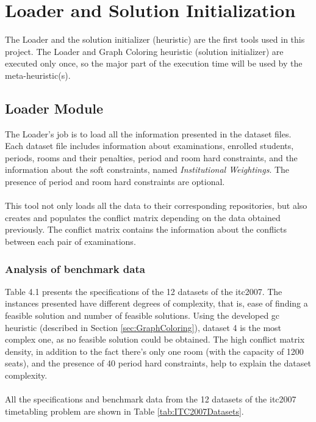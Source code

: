 \chapter{Loader and Solution Initialization}
\label{chap:SolutionInit}
\thispagestyle{plain}

The Loader and the solution initializer (heuristic) are the first tools used in this project. The Loader and Graph Coloring heuristic (solution initializer) are executed only once, so the major part of the execution time will be used by the meta-heuristic(s).

\section{Loader Module}
\label{sec:Loader}

The Loader's job is to load all the information presented in the dataset files. Each dataset file includes information about examinations, enrolled students, periods, rooms and their penalties, period and room hard constraints, and the information about the soft constraints, named \textit{Institutional Weightings}. The presence of period and room hard constraints are optional.\\
\\
This tool not only loads all the data to their corresponding repositories, but also creates and populates the conflict matrix depending on the data obtained previously. The conflict matrix contains the information about the conflicts between each pair of examinations.

\subsection{Analysis of benchmark data}

Table 4.1 presents the specifications of the 12 datasets of the \gls{itc2007}. The instances presented have different degrees of complexity, that is, ease of finding a feasible solution and number of feasible solutions. Using the developed \gls{gc} heuristic (described in Section \ref{sec:GraphColoring}), dataset 4 is the most complex one, as no feasible solution could be obtained. The high conflict matrix density, in addition to the fact there's only one room (with the capacity of 1200 seats), and the presence of 40 period hard constraints, help to explain the dataset complexity.\\
\\
All the specifications and benchmark data from the 12 datasets of the \gls{itc2007} timetabling problem are shown in Table \ref{tab:ITC2007Datasets}.

